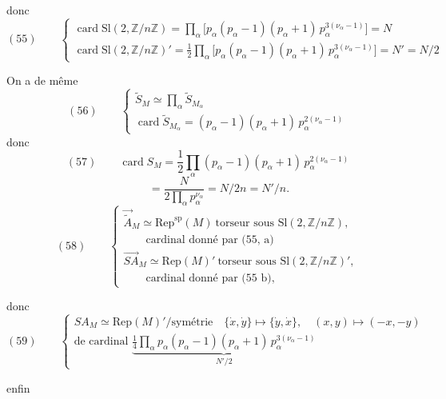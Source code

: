 \documentclass[11pt,a4paper]{article}
\begin{document}
donc
\[
(55)\qquad
\begin{cases}
\operatorname{card} \mathrm{Sl}(2, \mathbb{Z}/n\mathbb{Z}) = \prod_\alpha \bigl[p_\alpha (p_\alpha - 1)(p_\alpha + 1)\, p_\alpha^{3(\nu_\alpha - 1)}\bigr] = N \\
\operatorname{card} \mathrm{Sl}(2, \mathbb{Z}/n\mathbb{Z})' = \frac{1}{2} \prod_\alpha \bigl[p_\alpha (p_\alpha - 1)(p_\alpha + 1)\, p_\alpha^{3(\nu_\alpha - 1)}\bigr] = N' = N/2
\end{cases}
\]


On a de même
\[
(56)\qquad
\begin{cases}
\widetilde{S}_M \simeq \prod_\alpha \widetilde{S}_{M_\alpha} \\
\operatorname{card} \widetilde{S}_{M_\alpha} = (p_\alpha - 1)(p_\alpha + 1)\, p_\alpha^{2(\nu_\alpha - 1)}
\end{cases}
\]
donc
\[
(57)\qquad \operatorname{card} S_M = \frac{1}{2} \prod_\alpha (p_\alpha - 1)(p_\alpha + 1)\, p_\alpha^{2(\nu_\alpha - 1)}
\]
\[
\qquad = \frac{N}{2 \prod_\alpha p_\alpha^{\nu_\alpha}} = N/2n = N'/n .
\]
\[
(58)\qquad
\begin{cases}
\vec{\widetilde{A}}_M \simeq \mathrm{Rep}^{\mathrm{sp}}(M) \ \text{torseur sous } \mathrm{Sl}(2, \mathbb{Z}/n\mathbb{Z}), \\
\qquad \text{cardinal donné par (55, a)} \\
\overrightarrow{SA}_M \simeq \mathrm{Rep}(M)' \ \text{torseur sous } \mathrm{Sl}(2, \mathbb{Z}/n\mathbb{Z})', \\
\qquad \text{cardinal donné par (55 b),}
\end{cases}
\]

donc
\[
(59)\qquad
\begin{cases}
SA_M \simeq \mathrm{Rep}(M)'/\text{symétrie} \quad \{\dot x, \dot y\} \mapsto \{\dot y, \dot x\}, \quad (x,y) \mapsto (-x,-y) \\
\text{de cardinal } \underbrace{\tfrac{1}{4} \prod_\alpha p_\alpha (p_\alpha - 1)(p_\alpha + 1)\, p_\alpha^{3(\nu_\alpha - 1)}}_{N'/2}
\end{cases}
\]

enfin 
\end{document}
